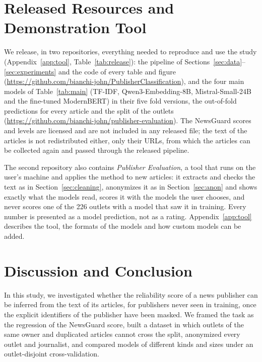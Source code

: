 \documentclass[11pt,a4paper]{article}
\begin{document}
\section{Released Resources and Demonstration Tool}\label{sec:tool}
We release, in two repositories, everything needed to reproduce and use the study (Appendix~\ref{app:tool},
Table~\ref{tab:release}): the pipeline of Sections~\ref{sec:data}--\ref{sec:experiments} and the code of every table and
figure (\url{https://github.com/bianchi-john/PublisherClassification}), and the four main models of Table~\ref{tab:main} (TF-IDF, Qwen3-Embedding-8B, Mistral-Small-24B and the fine-tuned
ModernBERT) in their five fold versions, the out-of-fold predictions for every article and the split of the
outlets (\url{https://github.com/bianchi-john/publisher-evaluation}). The NewsGuard scores and levels are licensed and
are not included in any released file; the text of the articles is not redistributed either, only their URLs, from
which the articles can be collected again and passed through the released pipeline.

The second repository also contains \emph{Publisher Evaluation}, a tool that runs on the user's machine and applies the
method to new articles: it extracts and checks the text as in Section~\ref{sec:cleaning}, anonymizes it as in
Section~\ref{sec:anon} and shows exactly what the models read, scores it with the models the user chooses, and never
scores one of the 226 outlets with a model that saw it in training. Every number is presented as a model prediction,
not as a rating. Appendix~\ref{app:tool} describes the tool, the formats of the models and how custom models can be
added.

\section{Discussion and Conclusion}\label{sec:conclusion}
In this study, we investigated whether the reliability score of a news publisher can be inferred from the text of its
articles, for publishers never seen in training, once the explicit identifiers of the publisher have been masked. We framed the task as the regression of the NewsGuard score, built a dataset in which outlets of the same owner
and duplicated articles cannot cross the split, anonymized every outlet and journalist, and compared models of
different kinds and sizes under an outlet-disjoint cross-validation.
\end{document}
